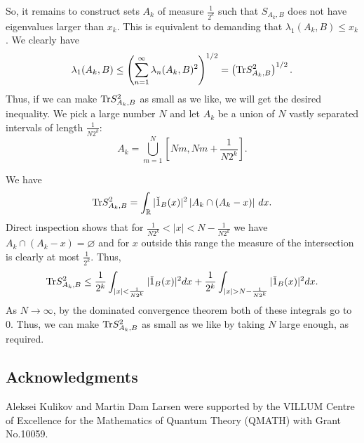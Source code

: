 \documentclass[12pt]{amsart}
\numberwithin{equation}{section}
\newcommand{\R}{\mathbb{R}}
\begin{document}
So, it remains to construct sets $A_k$ of measure $\frac{1}{2^k}$ such that $S_{A_k, B}$ does not have eigenvalues larger than $x_k$. This is equivalent to demanding that $\lambda_1(A_k, B) \le x_k$. We clearly have 
$$\lambda_1(A_k, B) \le \left(\sum_{n=1}^\infty \lambda_n(A_k,B)^2\right)^{1/2} = \left({\rm Tr}S_{A_k,B}^2\right)^{1/2}.$$
Thus, if we can make ${\rm Tr}S_{A_k,B}^2$ as small as we like, we will get the desired inequality. We pick a large number $N$ and let $A_k$ be a union of $N$ vastly separated intervals of length $\frac{1}{N2^k}$:
$$A_k = \bigcup_{m=1}^N \left[Nm, Nm + \frac{1}{N2^k}\right].$$

We have 
$${\rm Tr}S_{A_k,B}^2 = \int_\R |\check{1}_B(x)|^2 \left|A_k \cap (A_k - x)\right|\,dx.$$
Direct inspection shows that for $\frac{1}{N2^k}< |x| < N-\frac{1}{N2^k}$ we have $A_k \cap (A_k - x) = \varnothing$ and for $x$ outside this range the measure of the intersection is clearly at most $\frac{1}{2^k}$. Thus, 
$${\rm Tr}S_{A_k,B}^2 \le \frac{1}{2^k}\int_{|x| < \frac{1}{N2^k}} |\check{1}_B(x)|^2dx + \frac{1}{2^k}\int_{|x| >N- \frac{1}{N2^k}} |\check{1}_B(x)|^2dx.$$
As $N\to \infty$, by the dominated convergence theorem both of these integrals go to $0$. Thus, we can make ${\rm Tr}S_{A_k,B}^2$ as small as we like by taking $N$ large enough, as required.

\subsection*{Acknowledgments} Aleksei Kulikov and Martin Dam Larsen were supported by the VILLUM Centre of Excellence for the Mathematics of Quantum Theory (QMATH) with Grant No.10059.




\end{document}

